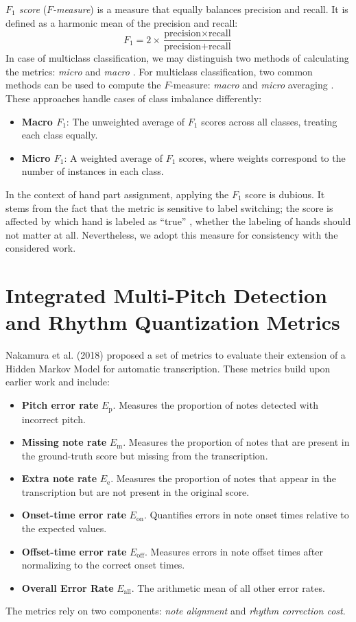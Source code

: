 \emph{$F_1$ score} (\emph{$F$-measure}) is a measure that equally balances precision and recall. It is defined as a harmonic mean of the precision and recall: \[F_1 = 2 \times \frac{\textrm{precision} \times \textrm{recall}}{\textrm{precision} + \textrm{recall}}\] In case of multiclass classification, we may distinguish two methods of calculating the metrics: \emph{micro} and \emph{macro} \cite[p. 259--261]{Manning2008}. For multiclass classification, two common methods can be used to compute the $F$-measure: \emph{macro} and \emph{micro} averaging \cite[p. 259--261]{Manning2008}. These approaches handle cases of class imbalance differently:\begin{itemize}
	\item \textbf{Macro $F_1$}: The unweighted average of $F_1$ scores across all classes, treating each class equally.
	\item \textbf{Micro $F_1$}: A weighted average of $F_1$ scores, where weights correspond to the number of instances in each class.\end{itemize}

In the context of hand part assignment, applying the $F_1$ score is dubious. It stems from the fact that the metric is sensitive to label switching; the score is affected by which hand is labeled as ``true'' \cite{Sokolova2009}, whether the labeling of hands should not matter at all. Nevertheless, we adopt this measure for consistency with the considered work.

\section{Integrated Multi-Pitch Detection and Rhythm Quantization Metrics}

Nakamura et al. (2018) proposed a set of metrics to evaluate their extension of a Hidden Markov Model \cite{Nakamura2018} for automatic transcription. These metrics build upon earlier work \cite{Nakamura2017a} and include: \begin{itemize}
	\item \textbf{Pitch error rate} $E_{\textrm{p}}$. Measures the proportion of notes detected with incorrect pitch.
	\item \textbf{Missing note rate} $E_{\textrm{m}}$. Measures the proportion of notes that are present in the ground-truth score but missing from the transcription.
	\item \textbf{Extra note rate} $E_{\textrm{e}}$. Measures the proportion of notes that appear in the transcription but are not present in the original score.
	\item \textbf{Onset-time error rate} $E_{\textrm{on}}$. Quantifies errors in note onset times relative to the expected values.
	\item \textbf{Offset-time error rate} $E_{\textrm{off}}$. Measures errors in note offset times after normalizing to the correct onset times.
	\item \textbf{Overall Error Rate} $E_{\textrm{all}}$. The arithmetic mean of all other error rates.
\end{itemize} The metrics rely on two components: \emph{note alignment} and \emph{rhythm correction cost}.

